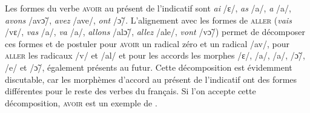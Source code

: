{      Les formes du verbe \textsc{avoir} au présent de l'indicatif sont \textit{ai} /ɛ/,  \textit{as} /a/, \textit{a} /a/, \textit{avons} /av\~{ɔ}/, \textit{avez} /ave/, \textit{ont} /\~{ɔ}/. L'alignement avec les formes de \textsc{aller} (\textit{vais} /vɛ/, \textit{vas} /a/, \textit{va} /a/, \textit{allons} /al\~{ɔ}/, \textit{allez} /ale/, \textit{vont} /v\~{ɔ}/) permet de décomposer ces formes et de postuler pour \textsc{avoir} un radical zéro et un radical /av/, pour \textsc{aller} les radicaux /v/ et /al/ et pour les accords les morphes /ɛ/, /a/, /a/, /\~{ɔ}/, /e/ et /\~{ɔ}/, également présents au futur. Cette décomposition est évidemment discutable, car les morphèmes d'accord au présent de l'indicatif ont des formes différentes pour le reste des verbes du français. Si l'on accepte cette décomposition, \textsc{avoir} est un exemple de .
}
